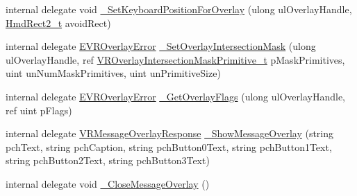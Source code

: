 \begin{DoxyCompactItemize}
\item 
internal delegate void \mbox{\hyperlink{struct_valve_1_1_v_r_1_1_i_v_r_overlay_a2caf87222d0045e8ad341e4ede54a985}{\+\_\+\+Set\+Keyboard\+Position\+For\+Overlay}} (ulong ul\+Overlay\+Handle, \mbox{\hyperlink{struct_valve_1_1_v_r_1_1_hmd_rect2__t}{Hmd\+Rect2\+\_\+t}} avoid\+Rect)
\item 
internal delegate \mbox{\hyperlink{namespace_valve_1_1_v_r_aaee5c5144f42b7969d45b854f51b0c18}{E\+V\+R\+Overlay\+Error}} \mbox{\hyperlink{struct_valve_1_1_v_r_1_1_i_v_r_overlay_a4c59154888075e11f6eb2515fa9f3678}{\+\_\+\+Set\+Overlay\+Intersection\+Mask}} (ulong ul\+Overlay\+Handle, ref \mbox{\hyperlink{struct_valve_1_1_v_r_1_1_v_r_overlay_intersection_mask_primitive__t}{V\+R\+Overlay\+Intersection\+Mask\+Primitive\+\_\+t}} p\+Mask\+Primitives, uint un\+Num\+Mask\+Primitives, uint un\+Primitive\+Size)
\item 
internal delegate \mbox{\hyperlink{namespace_valve_1_1_v_r_aaee5c5144f42b7969d45b854f51b0c18}{E\+V\+R\+Overlay\+Error}} \mbox{\hyperlink{struct_valve_1_1_v_r_1_1_i_v_r_overlay_a0706f71c80fe30f2327615ff966bdd66}{\+\_\+\+Get\+Overlay\+Flags}} (ulong ul\+Overlay\+Handle, ref uint p\+Flags)
\item 
internal delegate \mbox{\hyperlink{namespace_valve_1_1_v_r_a034ef9b0267f2fa2e4a227bc2c73473f}{V\+R\+Message\+Overlay\+Response}} \mbox{\hyperlink{struct_valve_1_1_v_r_1_1_i_v_r_overlay_afadb2a0056062a8d7e051a7d961f782e}{\+\_\+\+Show\+Message\+Overlay}} (string pch\+Text, string pch\+Caption, string pch\+Button0\+Text, string pch\+Button1\+Text, string pch\+Button2\+Text, string pch\+Button3\+Text)
\item 
internal delegate void \mbox{\hyperlink{struct_valve_1_1_v_r_1_1_i_v_r_overlay_a66281ebc63f5c30dc48e38ec5c4c8c5e}{\+\_\+\+Close\+Message\+Overlay}} ()
\end{DoxyCompactItemize}

